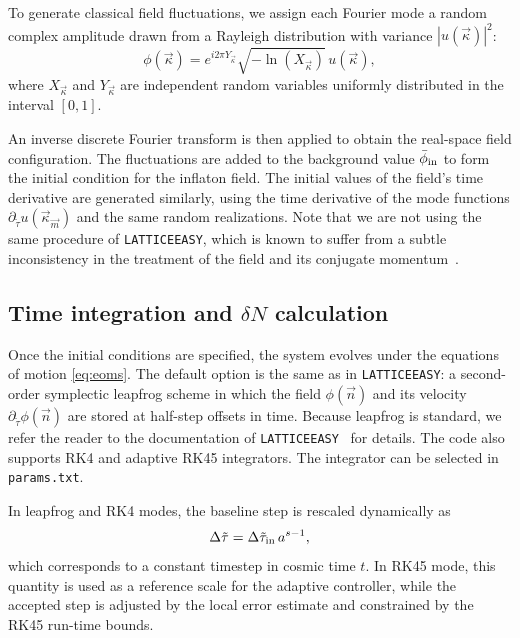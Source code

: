 \documentclass[aps, nofootinbib,superscriptaddress, preprintnumbers, longbibliography]{article}
\begin{document}
To generate classical field fluctuations, we assign each Fourier mode a random complex amplitude drawn from a Rayleigh distribution with variance $|u(\vec\kappa)|^2$:
\begin{equation}
\label{eq:randommodes}
\phi(\vec\kappa) = e^{i 2\pi Y_{\vec{\kappa}}} \sqrt{-\ln(X_{\vec{\kappa}})} \, u(\vec\kappa),
\end{equation}
where $X_{\vec{\kappa}}$ and $Y_{\vec{\kappa}}$ are independent random variables uniformly distributed in the interval $[0, 1]$. 

An inverse discrete Fourier transform is then applied to obtain the real-space field configuration. The fluctuations are added to the background value $\bar{\phi}_{\rm in}$ to form the initial condition for the inflaton field. The initial values of the field’s time derivative are generated similarly, using the time derivative of the mode functions $\partial_{\tilde\tau} u(\vec\kappa_{\vec{m}})$ and the same random realizations. Note that we are not using the same procedure of \texttt{LATTICEEASY}, which is known to suffer from a subtle inconsistency in the treatment of the field and its conjugate momentum~\cite{Frolov_2008}.

\subsection{Time integration and \texorpdfstring{$\delta N$}{deltaN} calculation}

Once the initial conditions are specified, the system evolves under the equations of motion \cref{eq:eoms}. The default option is the same as in \texttt{LATTICEEASY}: a second-order symplectic leapfrog scheme in which the field $\phi(\vec{n})$ and its velocity $\partial_{\tilde\tau} \phi(\vec{n})$ are stored at half-step offsets in time. Because leapfrog is standard, we refer the reader to the documentation of \texttt{LATTICEEASY}~\cite{latticeeasy} for details. The code also supports RK4 and adaptive RK45 integrators. The integrator can be selected in \texttt{params.txt}.

In leapfrog and RK4 modes, the baseline step is rescaled dynamically as
\begin{equation}
\Delta \tilde{\tau} = \Delta \tilde{\tau}_{\rm in} \, a^{s-1},
\end{equation}
which corresponds to a constant timestep in cosmic time $t$. In RK45 mode, this quantity is used as a reference scale for the adaptive controller, while the accepted step is adjusted by the local error estimate and constrained by the RK45 run-time bounds.
\end{document}
